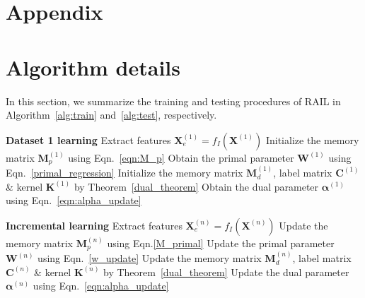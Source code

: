 \section*{Appendix}

\section{Algorithm details}
\label{app:alg}
In this section, we summarize the training and testing procedures of RAIL in Algorithm~\ref{alg:train} and~\ref{alg:test}, respectively.

\begin{algorithm}[hbt!]
\caption{RAIL training}\label{alg:train}
\begin{algorithmic}
\State \textbf{Dataset 1 learning}
\State Extract features $\mathbf{X}_e^{\left(1\right)} = f_I\left(\mathbf{X}^{\left(1\right)}\right)$
\State Initialize the memory matrix $\mathbf{M}_p^{\left(1\right)}$ using Eqn.~\ref{eqn:M_p}
\State Obtain the primal parameter $\mathbf{W}^{\left(1\right)}$ using Eqn.~\ref{primal_regression}
\EndIf
{}
\State Initialize the memory matrix $\mathbf{M}_d^{\left(1\right)}$, label matrix $\mathbf{C}^{\left(1\right)}$ \& kernel $\mathbf{K}^{\left(1\right)}$ by Theorem~\ref{dual_theorem}
\State Obtain the dual parameter $\boldsymbol{\alpha}^{\left(1\right)}$ using Eqn.~\ref{eqn:alpha_update}
\EndIf
\EndFor

\State \textbf{Incremental learning}
\State Extract features $\mathbf{X}_e^{\left(n\right)} = f_I\left(\mathbf{X}^{\left(n\right)}\right)$
\State Update the memory matrix $\mathbf{M}_p^{\left(n\right)}$ using Eqn.\ref{M_primal}
\State Update the primal parameter $\mathbf{W}^{\left(n\right)}$ using Eqn.~\ref{w_update}
\EndIf
{}
\State Update the memory matrix $\mathbf{M}_d^{\left(n\right)}$, label matrix $\mathbf{C}^{\left(n\right)}$ \& kernel $\mathbf{K}^{\left(n\right)}$ by Theorem~\ref{dual_theorem}
\State Update the dual parameter $\boldsymbol{\alpha}^{\left(n\right)}$ using Eqn.~\ref{eqn:alpha_update}
\EndIf
\EndFor
\EndFor
\end{algorithmic}
\end{algorithm}

